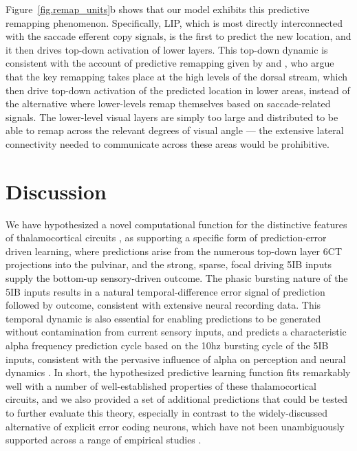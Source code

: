 \documentclass[11pt,twoside]{article}
\newif\myifpdf
\begin{document}
Figure~\ref{fig.remap_units}b shows that our model exhibits this predictive remapping phenomenon.  Specifically, LIP, which is most directly interconnected with the saccade efferent copy signals, is the first to predict the new location, and it then drives top-down activation of lower layers.  This top-down dynamic is consistent with the account of predictive remapping given by \citet{Wurtz08} and \citet{CavanaghHuntAfrazEtAl10}, who argue that the key remapping takes place at the high levels of the dorsal stream, which then drive top-down activation of the predicted location in lower areas, instead of the alternative where lower-levels remap themselves based on saccade-related signals.  The lower-level visual layers are simply too large and distributed to be able to remap across the relevant degrees of visual angle --- the extensive lateral connectivity needed to communicate across these areas would be prohibitive.

\section{Discussion}

We have hypothesized a novel computational function for the distinctive features of thalamocortical circuits \citep{ShermanGuillery06,UsreySherman18}, as supporting a specific form of prediction-error driven learning, where predictions arise from the numerous top-down layer 6CT projections into the pulvinar, and the strong, sparse, focal driving 5IB inputs supply the bottom-up sensory-driven outcome. The phasic bursting nature of the 5IB inputs results in a natural temporal-difference error signal of prediction followed by outcome, consistent with extensive neural recording data.  This temporal dynamic is also essential for enabling predictions to be generated without contamination from current sensory inputs, and predicts a characteristic alpha frequency prediction cycle based on the 10hz bursting cycle of the 5IB inputs, consistent with the pervasive influence of alpha on perception and neural dynamics \citep{JensenBonnefondMarshallEtAl15,VanRullen16,ClaytonYeungKadosh18,FosterAwh19}.  In short, the hypothesized predictive learning function fits remarkably well with a number of well-established properties of these thalamocortical circuits, and we also provided a set of additional predictions that could be tested to further evaluate this theory, especially in contrast to the widely-discussed alternative of explicit error coding neurons, which have not been unambiguously supported across a range of empirical studies \citep{WalshMcGovernClarkEtAl20}.
\end{document}
